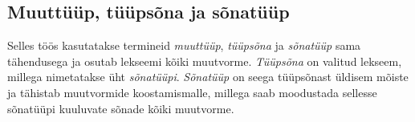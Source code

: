 \documentclass[12pt,a4paper]{article}
\begin{document}



\subsection{Muuttüüp, tüüpsõna ja sõnatüüp}

Selles töös kasutatakse termineid \emph{muuttüüp}, \emph{tüüpsõna} ja \emph{sõnatüüp} sama tähendusega ja osutab lekseemi kõiki muutvorme. \emph{Tüüpsõna} on valitud lekseem, millega nimetatakse üht \emph{sõnatüüpi}. \emph{Sõnatüüp} on seega tüüpsõnast üldisem mõiste ja tähistab muutvormide koostamismalle, millega saab moodustada sellesse sõnatüüpi kuuluvate sõnade kõiki muutvorme.
\end{document}
